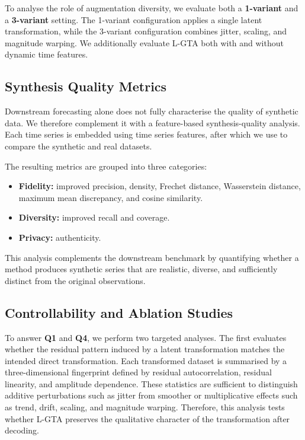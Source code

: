 To analyse the role of augmentation diversity, we evaluate both a \textbf{1-variant} and a \textbf{3-variant} setting. The 1-variant configuration applies a single latent transformation, while the 3-variant configuration combines jitter, scaling, and magnitude warping. We additionally evaluate L-GTA both with and without dynamic time features.

\subsection{Synthesis Quality Metrics}

Downstream forecasting alone does not fully characterise the quality of synthetic data. We therefore complement it with a feature-based synthesis-quality analysis. Each time series is embedded using time series features, after which we use to compare the synthetic and real datasets.

The resulting metrics are grouped into three categories:
\begin{itemize}
    \item \textbf{Fidelity:} improved precision, density, Frechet distance, Wasserstein distance, maximum mean discrepancy, and cosine similarity.
    \item \textbf{Diversity:} improved recall and coverage.
    \item \textbf{Privacy:} authenticity.
\end{itemize}

This analysis complements the downstream benchmark by quantifying whether a method produces synthetic series that are realistic, diverse, and sufficiently distinct from the original observations.

\subsection{Controllability and Ablation Studies}

To answer \textbf{Q1} and \textbf{Q4}, we perform two targeted analyses. The first evaluates whether the residual pattern induced by a latent transformation matches the intended direct transformation. Each transformed dataset is summarised by a three-dimensional fingerprint defined by residual autocorrelation, residual linearity, and amplitude dependence. These statistics are sufficient to distinguish additive perturbations such as jitter from smoother or multiplicative effects such as trend, drift, scaling, and magnitude warping. Therefore, this analysis tests whether L-GTA preserves the qualitative character of the transformation after decoding.

